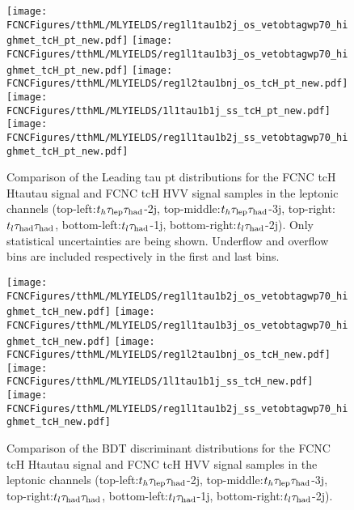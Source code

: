 \begin{figure}[htb]
  \centering
  \texttt{[image: \\FCNCFigures/tthML/MLYIELDS/reg1l1tau1b2j\_os\_vetobtagwp70\_highmet\_tcH\_pt\_new.pdf]}
  \texttt{[image: \\FCNCFigures/tthML/MLYIELDS/reg1l1tau1b3j\_os\_vetobtagwp70\_highmet\_tcH\_pt\_new.pdf]}
  \texttt{[image: \\FCNCFigures/tthML/MLYIELDS/reg1l2tau1bnj\_os\_tcH\_pt\_new.pdf]}
  \\
  \texttt{[image: \\FCNCFigures/tthML/MLYIELDS/1l1tau1b1j\_ss\_tcH\_pt\_new.pdf]}
  \texttt{[image: \\FCNCFigures/tthML/MLYIELDS/reg1l1tau1b2j\_ss\_vetobtagwp70\_highmet\_tcH\_pt\_new.pdf]}
\\
\caption{ Comparison of the Leading tau pt distributions for the FCNC tcH Htautau signal and FCNC tcH HVV signal samples in the leptonic channels
  (top-left:$t_h\tau_\text{lep}{}\tau_\text{had}$-2j, top-middle:$t_h\tau_\text{lep}{}\tau_\text{had}$-3j, top-right:$t_l\tau_\text{had}{}\tau_\text{had}$, bottom-left:$t_l\tau_\text{had}$-1j, bottom-right:$t_l\tau_\text{had}$-2j). Only statistical uncertainties are being shown. Underflow and overflow bins are included respectively in the first and last bins.}
\label{fig:check_tcH_HWW}
\end{figure}


\begin{figure}[htb]
  \centering
  \texttt{[image: \\FCNCFigures/tthML/MLYIELDS/reg1l1tau1b2j\_os\_vetobtagwp70\_highmet\_tcH\_new.pdf]}
  \texttt{[image: \\FCNCFigures/tthML/MLYIELDS/reg1l1tau1b3j\_os\_vetobtagwp70\_highmet\_tcH\_new.pdf]}
  \texttt{[image: \\FCNCFigures/tthML/MLYIELDS/reg1l2tau1bnj\_os\_tcH\_new.pdf]}
  \\
  \texttt{[image: \\FCNCFigures/tthML/MLYIELDS/1l1tau1b1j\_ss\_tcH\_new.pdf]}
  \texttt{[image: \\FCNCFigures/tthML/MLYIELDS/reg1l1tau1b2j\_ss\_vetobtagwp70\_highmet\_tcH\_new.pdf]}
\\
\caption{ Comparison of the BDT discriminant distributions for the FCNC tcH Htautau signal and FCNC tcH HVV signal samples in the leptonic channels
  (top-left:$t_h\tau_\text{lep}{}\tau_\text{had}$-2j, top-middle:$t_h\tau_\text{lep}{}\tau_\text{had}$-3j, top-right:$t_l\tau_\text{had}{}\tau_\text{had}$, bottom-left:$t_l\tau_\text{had}$-1j, bottom-right:$t_l\tau_\text{had}$-2j).}
\label{fig:BDT_tcH_HWW}
\end{figure}

